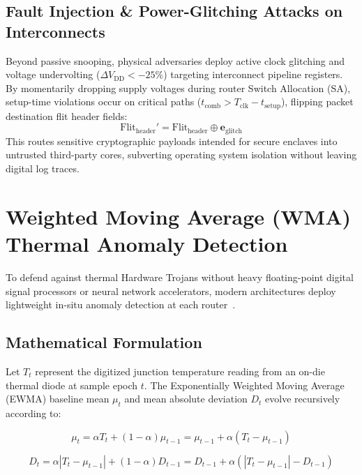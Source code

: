 \subsection{Fault Injection \& Power-Glitching Attacks on Interconnects}
Beyond passive snooping, physical adversaries deploy active clock glitching and voltage undervolting ($\Delta V_{\mathrm{DD}} < -25\%$) targeting interconnect pipeline registers. By momentarily dropping supply voltages during router Switch Allocation (SA), setup-time violations occur on critical paths ($t_{\mathrm{comb}} > T_{\mathrm{clk}} - t_{\mathrm{setup}}$), flipping packet destination flit header fields:
\begin{equation}
\mathrm{Flit}_{\mathrm{header}}' = \mathrm{Flit}_{\mathrm{header}} \oplus \mathbf{e}_{\mathrm{glitch}}
\end{equation}
This routes sensitive cryptographic payloads intended for secure enclaves into untrusted third-party cores, subverting operating system isolation without leaving digital log traces.

\section{Weighted Moving Average (WMA) Thermal Anomaly Detection}
\label{sec:wma-detection}

To defend against thermal Hardware Trojans without heavy floating-point digital signal processors or neural network accelerators, modern architectures deploy lightweight in-situ anomaly detection at each router~\cite{Hasanzadeh2026Heat}.

\subsection{Mathematical Formulation}
Let $T_t$ represent the digitized junction temperature reading from an on-die thermal diode at sample epoch $t$. The Exponentially Weighted Moving Average (EWMA) baseline mean $\mu_t$ and mean absolute deviation $D_t$ evolve recursively according to:

\begin{equation}
\mu_t = \alpha T_t + (1 - \alpha)\mu_{t-1} = \mu_{t-1} + \alpha(T_t - \mu_{t-1})
\label{eq:ewma-mean}
\end{equation}

\begin{equation}
D_t = \alpha |T_t - \mu_{t-1}| + (1 - \alpha)D_{t-1} = D_{t-1} + \alpha(|T_t - \mu_{t-1}| - D_{t-1})
\label{eq:ewma-dev}
\end{equation}

